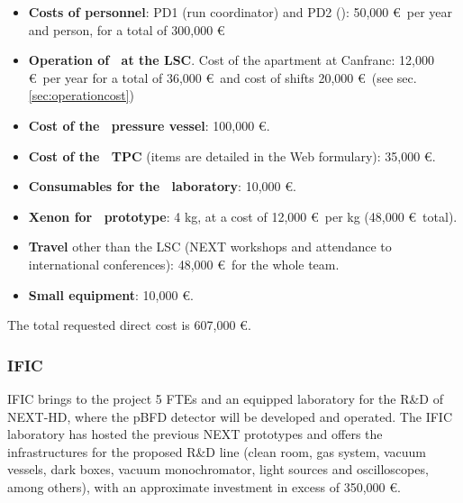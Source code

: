 \begin{itemize}[noitemsep,topsep=0pt,parsep=0pt,partopsep=0pt]
\item {\bf Costs of personnel}: PD1 (run coordinator) and PD2 (\HDEMO):  50,000 \euro\ per year and person, for a total of 300,000 \euro\ \item {\bf Operation of \Next\ at the LSC}. Cost of the apartment at Canfranc: 12,000 \euro\ per year for a total of 36,000 \euro\ and cost of shifts 20,000 \euro\ (see sec.\ref{sec:operationcost}) 
\item {\bf Cost of the \HDEMO\ pressure vessel}: 100,000 \euro.
\item {\bf Cost of the \HDEMO\ TPC} (items are detailed in the Web formulary):  35,000 \euro.
\item {\bf Consumables for the \HDEMO\ laboratory}: 10,000 \euro.
\item {\bf Xenon for \HDEMO\ prototype}: 4 kg, at a cost of  12,000 \euro\ per kg (48,000 \euro\ total). 
\item {\bf Travel} other than the LSC (NEXT workshops and attendance to international conferences): 48,000 \euro\ for the whole team. 
\item {\bf Small equipment}: 10,000 \euro.
\end{itemize}

The total requested direct cost is 607,000 \euro. 

\subsubsection{IFIC}

IFIC brings to the project 5 FTEs and an equipped laboratory for the R\&D of NEXT-HD, where the pBFD detector will be developed and operated. The IFIC laboratory has hosted the previous NEXT prototypes and offers the infrastructures for the proposed R\&D line (clean room, gas system, vacuum vessels, dark boxes, vacuum monochromator, light sources and oscilloscopes, among others), with an approximate investment in excess of 350,000 \euro. 

